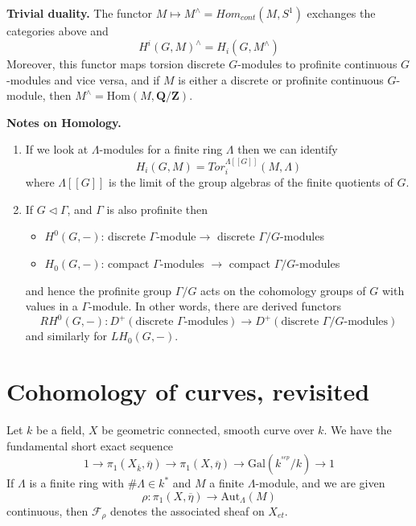\medskip\noindent
{\bf Trivial duality.}
The functor $M\mapsto M^\wedge = Hom_{cont}(M, S^1)$
exchanges the categories above and
$$
H^i(G, M)^\wedge = H_i(G, M^\wedge)
$$
Moreover, this functor maps torsion discrete $G$-modules to profinite
continuous $G$-modules and vice versa, and if $M$ is either a discrete or
profinite continuous $G$-module, then
$M^\wedge = \text{Hom}(M, \mathbf{Q}/\mathbf{Z})$.

\medskip\noindent
{\bf Notes on Homology.}
\begin{enumerate}
\item If we look at $\Lambda$-modules for a finite ring $\Lambda$
then we can identify
$$
H_i(G, M)=Tor_i^{\Lambda[[G]]}(M, \Lambda)
$$
where $\Lambda[[G]]$ is the limit of the group algebras of the finite
quotients of $G$.
\item If $G \vartriangleleft \Gamma$, and $\Gamma$ is also profinite
then
\begin{itemize}
\item $H^0(G, -)$: discrete $\Gamma$-module$\to$ discrete
$\Gamma/G$-modules
\item $H_0(G, -)$: compact $\Gamma$-modules $\to$ compact
$\Gamma/G$-modules
\end{itemize}
and hence the profinite group $\Gamma/G$ acts on the cohomology groups
of $G$ with values in a $\Gamma$-module. In other words, there are derived
functors
$$
RH^0(G, -) :
D^{+}(\text{discrete }\Gamma\text{-modules})
\longrightarrow
D^{+}(\text{discrete }\Gamma/G\text{-modules})
$$
and similarly for $LH_0(G, -)$.
\end{enumerate}








\section{Cohomology of curves, revisited}
\label{section-cohomology-curves-revisited}

\noindent
Let $k$ be a field, $X$ be geometric connected, smooth curve over $k$.
We have the fundamental short exact sequence
$$
1 \to
\pi_1(X_{\overline k}, \overline \eta) \to
\pi_1(X, \overline\eta) \to
\text{Gal}(k^{^{sep}}/k) \to 1
$$
If $\Lambda$ is a finite ring with $\#\Lambda\in k^*$ and $M$ a finite
$\Lambda$-module, and we are given
$$
\rho:\pi_1(X, \overline\eta) \to \text{Aut}_{\Lambda}(M)
$$
continuous, then $\mathcal{F}_\rho$ denotes the associated sheaf on $X_{et}$.

